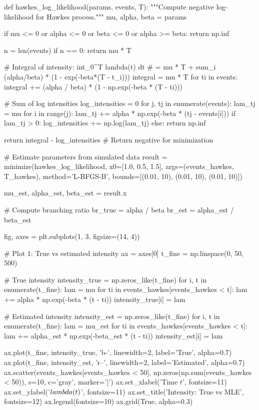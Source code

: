\documentclass[a4paper, 11pt]{article}
\begin{document}
\begin{pycode}
def hawkes_log_likelihood(params, events, T):
    """Compute negative log-likelihood for Hawkes process."""
    mu, alpha, beta = params

    if mu <= 0 or alpha <= 0 or beta <= 0 or alpha >= beta:
        return np.inf

    n = len(events)
    if n == 0:
        return mu * T

    # Integral of intensity: int_0^T lambda(t) dt
    # = mu * T + sum_i (alpha/beta) * (1 - exp(-beta*(T - t_i)))
    integral = mu * T
    for ti in events:
        integral += (alpha / beta) * (1 - np.exp(-beta * (T - ti)))

    # Sum of log intensities
    log_intensities = 0
    for j, tj in enumerate(events):
        lam_tj = mu
        for i in range(j):
            lam_tj += alpha * np.exp(-beta * (tj - events[i]))
        if lam_tj > 0:
            log_intensities += np.log(lam_tj)
        else:
            return np.inf

    return integral - log_intensities  # Return negative for minimization

# Estimate parameters from simulated data
result = minimize(hawkes_log_likelihood, x0=[1.0, 0.5, 1.5],
                  args=(events_hawkes, T_hawkes),
                  method='L-BFGS-B',
                  bounds=[(0.01, 10), (0.01, 10), (0.01, 10)])

mu_est, alpha_est, beta_est = result.x

# Compute branching ratio
br_true = alpha / beta
br_est = alpha_est / beta_est

fig, axes = plt.subplots(1, 3, figsize=(14, 4))

# Plot 1: True vs estimated intensity
ax = axes[0]
t_fine = np.linspace(0, 50, 500)

# True intensity
intensity_true = np.zeros_like(t_fine)
for i, t in enumerate(t_fine):
    lam = mu
    for ti in events_hawkes[events_hawkes < t]:
        lam += alpha * np.exp(-beta * (t - ti))
    intensity_true[i] = lam

# Estimated intensity
intensity_est = np.zeros_like(t_fine)
for i, t in enumerate(t_fine):
    lam = mu_est
    for ti in events_hawkes[events_hawkes < t]:
        lam += alpha_est * np.exp(-beta_est * (t - ti))
    intensity_est[i] = lam

ax.plot(t_fine, intensity_true, 'b-', linewidth=2, label='True', alpha=0.7)
ax.plot(t_fine, intensity_est, 'r--', linewidth=2, label='Estimated', alpha=0.7)
ax.scatter(events_hawkes[events_hawkes < 50],
           np.zeros(np.sum(events_hawkes < 50)), s=10, c='gray', marker='|')
ax.set_xlabel('Time $t$', fontsize=11)
ax.set_ylabel('$\\lambda(t)$', fontsize=11)
ax.set_title('Intensity: True vs MLE', fontsize=12)
ax.legend(fontsize=10)
ax.grid(True, alpha=0.3)


\end{pycode}
\end{document}
